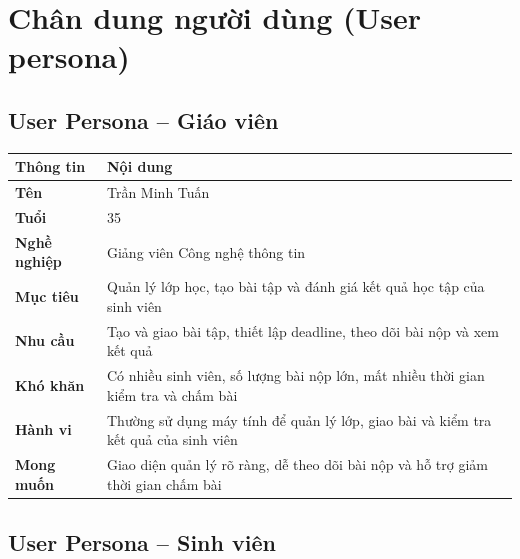 \documentclass[12pt,a4paper,oneside]{report}
\begin{document}
\newpage

\section{Chân dung người dùng (User persona)}

\subsection{User Persona -- Giáo viên}


\begin{center}
\vspace{4pt}
\begin{tabular}{|>{\bfseries}p{3.2cm}|p{11.5cm}|}
\hline
Thông tin & Nội dung \\
\hline
Tên & Trần Minh Tuấn \\
\hline
Tuổi & 35 \\
\hline
Nghề nghiệp & Giảng viên Công nghệ thông tin \\
\hline
Mục tiêu & Quản lý lớp học, tạo bài tập và đánh giá kết quả học tập của sinh viên \\
\hline
Nhu cầu & Tạo và giao bài tập, thiết lập deadline, theo dõi bài nộp và xem kết quả \\
\hline
Khó khăn & Có nhiều sinh viên, số lượng bài nộp lớn, mất nhiều thời gian kiểm tra và chấm bài \\
\hline
Hành vi & Thường sử dụng máy tính để quản lý lớp, giao bài và kiểm tra kết quả của sinh viên \\
\hline
Mong muốn & Giao diện quản lý rõ ràng, dễ theo dõi bài nộp và hỗ trợ giảm thời gian chấm bài \\
\hline
\end{tabular}
\end{center}

\subsection{User Persona -- Sinh viên}
\end{document}

